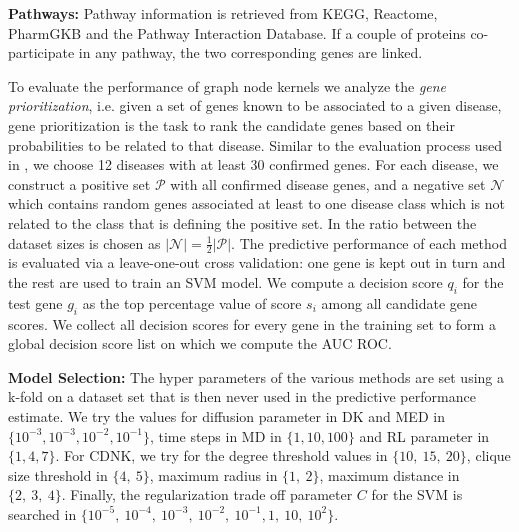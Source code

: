 \documentclass[review]{elsarticle}
\begin{document}
\textbf{Pathways:} Pathway information is retrieved from KEGG, Reactome, PharmGKB and the Pathway Interaction Database. If a couple of proteins co-participate in any pathway, the two corresponding genes are linked.  

To evaluate the performance of graph node kernels we analyze the {\em gene prioritization}, i.e. given a set of genes known to be associated to a given disease, gene prioritization is the task to rank the candidate genes based on their probabilities to be related to that disease. Similar to the evaluation process used in \cite{chen2014disease}, we choose 12 diseases \cite{goh2007human} with at least 30 confirmed genes. For each disease, we construct a positive set $\mathcal{P}$ with all confirmed disease genes, and a negative set $\mathcal{N}$ which contains random genes associated at least to one disease class which is not related to the class that is defining the positive set. In \cite{chen2014disease} the ratio between the dataset sizes is chosen as $\vert \mathcal{N} \vert = \frac{1}{2} \vert \mathcal{P} \vert$. The predictive performance of each method is evaluated via a leave-one-out cross validation: one gene is kept out in turn and the rest are used to train an SVM model. We compute a decision score $q_i$ for the test gene $g_i$ as the top percentage value of score $s_i$ among all candidate gene scores. We collect all decision scores for every gene in the training set to form a global decision score list on which we compute the AUC ROC.

\textbf{Model Selection:}
The hyper parameters of the various methods are set using a k-fold on a dataset set that is then never used in the predictive performance estimate. We try the values for diffusion parameter in DK and MED in $\lbrace 10^{-3}, 10^{-3}, 10^{-2}, 10^{-1} \rbrace$, time steps in MD in $\lbrace 1, 10, 100 \rbrace$ and RL parameter in $\lbrace 1, 4, 7 \rbrace$. For CDNK, we try for the degree threshold values in $\lbrace 10,\ 15,\ 20 \rbrace$, clique size threshold in $\lbrace 4,\ 5 \rbrace$, maximum radius in $\lbrace 1,\ 2 \rbrace$, maximum distance in $\lbrace 2,\ 3,\ 4 \rbrace$. Finally, the regularization trade off parameter $C$ for the SVM is searched in $\lbrace 10^{-5},  \ 10^{-4}, \ 10^{-3},\ 10^{-2},\ 10^{-1}, 1,\ 10,\ 10^2 \rbrace$.
\end{document}
